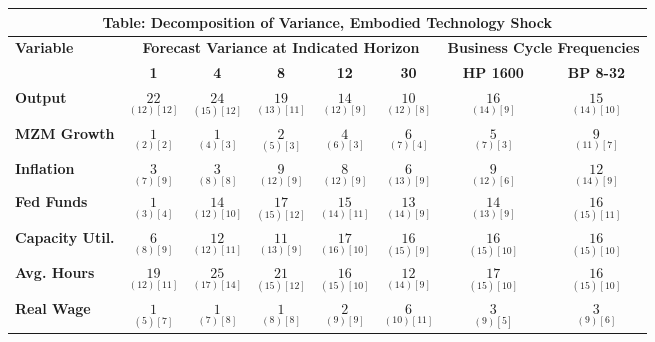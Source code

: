 \documentclass{article}
\begin{document}
 
 \begin{tabular}{|l|c|@{}c|c|@{}c|c|@{}c|c|} 
 \hline 
 \multicolumn{8}{|c|}{\textbf{Table: Decomposition of Variance, Embodied Technology Shock}} \\ \hline 
 \textbf{Variable} & \multicolumn{5}{|c}{\textbf{Forecast Variance at 
 Indicated Horizon}} & \multicolumn{2}{|c|}{\textbf{Business Cycle 
 Frequencies}} \\ \cline{2-8} 
 & \textbf{1} & \textbf{4} & \textbf{8} & \textbf{12} & \textbf{30} & \textbf{%
 HP 1600} & \textbf{BP 8-32} \\ \hline\hline 
 \textbf{Output} & $\underset{( 12) [ 12]}{ 22}$ & $\underset{( 15) [ 12]}{ 24}$ & $\underset{( 13) [ 11]}{ 19}$ & $\underset{( 12) [  9]}{ 14}$ & $\underset{( 12) [  8]}{ 10}$ & $\underset{( 14) [  9]}{ 16}$ & $\underset{( 14) [ 10]}{ 15}$ \\ \hline 
 \textbf{MZM Growth} & $\underset{(  2) [  2]}{  1}$ & $\underset{(  4) [  3]}{  1}$ & $\underset{(  5) [  3]}{  2}$ & $\underset{(  6) [  3]}{  4}$ & $\underset{(  7) [  4]}{  6}$ & $\underset{(  7) [  3]}{  5}$ & $\underset{( 11) [  7]}{  9}$ \\ \hline 
 \textbf{Inflation} & $\underset{(  7) [  9]}{  3}$ & $\underset{(  8) [  8]}{  3}$ & $\underset{( 12) [  9]}{  9}$ & $\underset{( 12) [  9]}{  8}$ & $\underset{( 13) [  9]}{  6}$ & $\underset{( 12) [  6]}{  9}$ & $\underset{( 14) [  9]}{ 12}$ \\ \hline 
 \textbf{Fed Funds} & $\underset{(  3) [  4]}{  1}$ & $\underset{( 12) [ 10]}{ 14}$ & $\underset{( 15) [ 12]}{ 17}$ & $\underset{( 14) [ 11]}{ 15}$ & $\underset{( 14) [  9]}{ 13}$ & $\underset{( 13) [  9]}{ 14}$ & $\underset{( 15) [ 11]}{ 16}$ \\ \hline 
 \textbf{Capacity Util.} & $\underset{(  8) [  9]}{  6}$ & $\underset{( 12) [ 11]}{ 12}$ & $\underset{( 13) [  9]}{ 11}$ & $\underset{( 16) [ 10]}{ 17}$ & $\underset{( 15) [  9]}{ 16}$ & $\underset{( 15) [ 10]}{ 16}$ & $\underset{( 15) [ 10]}{ 16}$ \\ \hline 
 \textbf{Avg. Hours} & $\underset{( 12) [ 11]}{ 19}$ & $\underset{( 17) [ 14]}{ 25}$ & $\underset{( 15) [ 12]}{ 21}$ & $\underset{( 15) [ 10]}{ 16}$ & $\underset{( 14) [  9]}{ 12}$ & $\underset{( 15) [ 10]}{ 17}$ & $\underset{( 15) [ 10]}{ 16}$ \\ \hline 
 \textbf{Real Wage} &  $\underset{(  5) [  7]}{  1}$ & $\underset{(  7) [  8]}{  1}$ & $\underset{(  8) [  8]}{  1}$ & $\underset{(  9) [  9]}{  2}$ & $\underset{( 10) [ 11]}{  6}$ & $\underset{(  9) [  5]}{  3}$ & $\underset{(  9) [  6]}{  3}$ \\ \hline 

\end{tabular}
\end{document}
